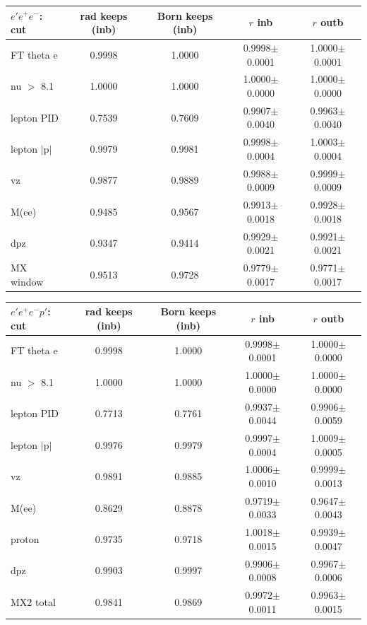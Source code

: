 \begin{tabular}{lcccc}\toprule
$e'e^+e^-$: cut & rad keeps (inb) & Born keeps (inb) & $r$ inb & $r$ outb \\\midrule
FT theta e & 0.9998 & 1.0000 & 0.9998$\pm$0.0001 & 1.0000$\pm$0.0001 \\
nu $>$ 8.1 & 1.0000 & 1.0000 & 1.0000$\pm$0.0000 & 1.0000$\pm$0.0000 \\
lepton PID & 0.7539 & 0.7609 & 0.9907$\pm$0.0040 & 0.9963$\pm$0.0040 \\
lepton $|$p$|$ & 0.9979 & 0.9981 & 0.9998$\pm$0.0004 & 1.0003$\pm$0.0004 \\
vz & 0.9877 & 0.9889 & 0.9988$\pm$0.0009 & 0.9999$\pm$0.0009 \\
M(ee) & 0.9485 & 0.9567 & 0.9913$\pm$0.0018 & 0.9928$\pm$0.0018 \\
dpz & 0.9347 & 0.9414 & 0.9929$\pm$0.0021 & 0.9921$\pm$0.0021 \\
MX window & 0.9513 & 0.9728 & 0.9779$\pm$0.0017 & 0.9771$\pm$0.0017 \\
\bottomrule\end{tabular}

\medskip

\begin{tabular}{lcccc}\toprule
$e'e^+e^-p'$: cut & rad keeps (inb) & Born keeps (inb) & $r$ inb & $r$ outb \\\midrule
FT theta e & 0.9998 & 1.0000 & 0.9998$\pm$0.0001 & 1.0000$\pm$0.0000 \\
nu $>$ 8.1 & 1.0000 & 1.0000 & 1.0000$\pm$0.0000 & 1.0000$\pm$0.0000 \\
lepton PID & 0.7713 & 0.7761 & 0.9937$\pm$0.0044 & 0.9906$\pm$0.0059 \\
lepton $|$p$|$ & 0.9976 & 0.9979 & 0.9997$\pm$0.0004 & 1.0009$\pm$0.0005 \\
vz & 0.9891 & 0.9885 & 1.0006$\pm$0.0010 & 0.9999$\pm$0.0013 \\
M(ee) & 0.8629 & 0.8878 & 0.9719$\pm$0.0033 & 0.9647$\pm$0.0043 \\
proton & 0.9735 & 0.9718 & 1.0018$\pm$0.0015 & 0.9939$\pm$0.0047 \\
dpz & 0.9903 & 0.9997 & 0.9906$\pm$0.0008 & 0.9967$\pm$0.0006 \\
MX2 total & 0.9841 & 0.9869 & 0.9972$\pm$0.0011 & 0.9963$\pm$0.0015 \\
\bottomrule\end{tabular}

\medskip

